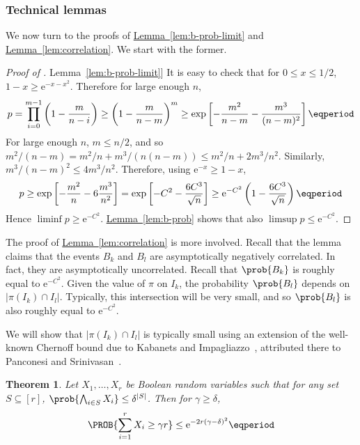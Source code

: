 \documentclass[11pt]{article}
\numberwithin{equation}{section}
\newtheorem{theorem}{Theorem}[section]
\theoremstyle{definition}
\theoremstyle{plain}
\newcommand{\eee}{\mathrm e}
\newcommand{\expref}[2]{\hyperref[#2]{#1~\ref{#2}}}
\begin{document}
\subsubsection{Technical lemmas}

We now turn to the proofs of \expref{Lemma}{lem:b-prob-limit} and \expref{Lemma}{lem:correlation}. We start with the former.

\begin{proof}[Proof of \expref{Lemma}{lem:b-prob-limit}]
 It is easy to check that for $0 \leq x \leq 1/2$, $1-x \geq \eee^{-x-x^2}$. Therefore for large enough $n$,
\begin{equation}
 p = \prod_{i=0}^{m-1} \left(1 - \frac{m}{n-i}\right) \geq
 \left(1 - \frac{m}{n-m}\right)^m \geq
 \exp \left[ -\frac{m^2}{n-m}-\frac{m^3}{(n-m)^2} \right] \eqperiod
\end{equation}
 For large enough $n$, $m \leq n/2$, and so $m^2/(n-m) = m^2/n + m^3/(n(n-m)) \leq m^2/n + 2m^3/n^2$. Similarly, $m^3/(n-m)^2 \leq 4m^3/n^2$. Therefore, using $\eee^{-x} \geq 1-x$,
\begin{equation}
 p \geq \exp \left[ -\frac{m^2}{n} - 6\frac{m^3}{n^2} \right] = \exp \left[ -C^2 -\frac{6C^3}{\sqrt{n}} \right] \geq \eee^{-C^2} \left(1 - \frac{6C^3}{\sqrt{n}}\right) \eqperiod
\end{equation}
 Hence $\liminf p \geq \eee^{-C^2}$. \expref{Lemma}{lem:b-prob} shows that also $\limsup p \leq \eee^{-C^2}$.
\end{proof}

The proof of \expref{Lemma}{lem:correlation} is more involved. Recall that the lemma claims that the events $B_k$ and $B_l$ are asymptotically negatively correlated. In fact, they are asymptotically uncorrelated. Recall that $\prob{B_k}$ is roughly equal to $\eee^{-C^2}$. Given the value of $\pi$ on $I_k$, the probability $\prob{B_l}$ depends on $|\pi(I_k) \cap I_l|$. Typically, this intersection will be very small, and so $\prob{B_l}$ is also roughly equal to $\eee^{-C^2}$.

%
%
%

We will show that $|\pi(I_k) \cap I_l|$ is typically small using an
  extension of the well-known Chernoff bound due to Kabanets and
  Impagliazzo~\cite[Theorem 1.1]{KI}, attributed there to Panconesi and
  Srinivasan~\cite{PS}.


\begin{theorem} \label{thm:chernoff}
 Let $X_1,\ldots,X_r$ be Boolean random variables such that for any set $S \subseteq [r]$, $\prob{\bigwedge_{i \in S} X_i} \leq \delta^{|S|}$. Then for $\gamma \geq \delta$,
\begin{equation*}
 \PROB{\sum_{i=1}^r X_i \geq \gamma r} \leq \eee^{-2r(\gamma - \delta)^2} \eqperiod
\end{equation*}
\end{theorem}
\end{document}

